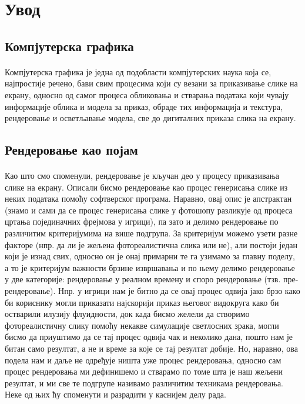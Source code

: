 \documentclass[12pt]{article}
\begin{document}
	\section{Увод}
	
	\subsection{Компјутерска графика}
	\paragraph{}
	Компјутерска графика је једна од подобласти компјутерских наука која се, најпростије речено, бави свим процесима који су везани за приказивање слике на екрану, односно од самог процеса обликовања и стварања података који чувају информације облика и модела за приказ, обраде тих информација и текстура, рендеровање и осветљавање модела, све до дигиталних приказа слика на екрану.
	\subsection{Рендеровање као појам}
	\paragraph{}
	Као што смо споменули, рендеровање је кључан део у процесу приказивања слике на екрану. Описали бисмо рендеровање као процес генерисања слике из неких података помоћу софтверског програма. Наравно, овај опис је апстрактан (знамо и сами да се процес генерисања слике у фотошопу разликује од процеса цртања појединачних фрејмова у игрици), па зато и делимо рендеровање по различитим критеријумима на више подгрупа. За критеријум можемо узети разне факторе (нпр. да ли је жељена фотореалистична слика или не), али постоји један који је изнад свих, односно он је онај примарни те га узимамо за главну поделу, а то је критеријум важности брзине извршавања и по њему делимо рендеровање у две категорије: рендеровање у реалном времену и споро рендеровање (тзв. пре-рендеровање). Нпр. у игрици нам је битно да се овај процес одвија јако брзо како би кориснику могли приказати најскорији приказ његовог видокруга како би остварили илузију флуидности, док када бисмо желели да створимо фотореалистичну слику помоћу некакве симулације светлосних зрака, могли бисмо да приуштимо да се тај процес одвија чак и неколико дана, пошто нам је битан само резултат, а не и време за које се тај резултат добије. Но, наравно, ова подела нам и даље не одређује ништа уже процес рендеровања, односно сам процес рендеровања ми дефинишемо и стварамо по томе шта је наш жељени резултат, и ми све те подгрупе називамо различитим техникама рендеровања. Неке од њих ћу споменути и разрадити у каснијем делу рада.
	
\end{document}
